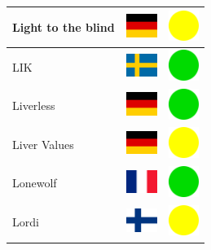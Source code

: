 \documentclass[12pt, a4paper, twoside]{report}
\begin{document}
\begin{center}
\begin{longtable}{|p{5cm}|p{2cm}|p{2cm}|}
 Light to the blind                                         & \includegraphics[width=1cm]{4x3/de} &   \includegraphics[width=1cm]{likes/m} \\ \hline
 LIK                                                        & \includegraphics[width=1cm]{4x3/se} &   \includegraphics[width=1cm]{likes/y} \\ \hline
 Liverless                                                  & \includegraphics[width=1cm]{4x3/de} &   \includegraphics[width=1cm]{likes/y} \\ \hline
 Liver Values                                               & \includegraphics[width=1cm]{4x3/de} &   \includegraphics[width=1cm]{likes/m} \\ \hline
 Lonewolf                                                   & \includegraphics[width=1cm]{4x3/fr} &   \includegraphics[width=1cm]{likes/y} \\ \hline
 Lordi                                                      & \includegraphics[width=1cm]{4x3/fi} &   \includegraphics[width=1cm]{likes/m} \\ \hline

\end{longtable}
\end{center}
\end{document}
